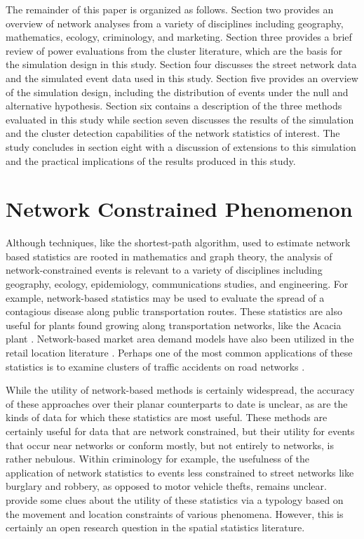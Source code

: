 \documentclass[12pt, letterpaper]{article}
\begin{document}
The remainder of this paper is organized as follows. Section two provides an overview of network analyses from a variety of disciplines including geography, mathematics, ecology, criminology, and marketing. Section three provides a brief review of power evaluations from the cluster literature, which are the basis for the simulation design in this study. Section four discusses the street network data and the simulated event data used in this study. Section five provides an overview of the simulation design, including the distribution of events under the null and alternative hypothesis. Section six contains a description of the three methods evaluated in this study while section seven discusses the results of the simulation and the cluster detection capabilities of the network statistics of interest. The study concludes in section eight with a discussion of extensions to this simulation and the practical implications of the results produced in this study.

\section{Network Constrained Phenomenon}

Although techniques, like the shortest-path algorithm, \citep{dijkstra1959note} used to estimate network based statistics are rooted in mathematics and graph theory, the analysis of network-constrained events is relevant to a variety of disciplines including geography, ecology, epidemiology, communications studies, and engineering. For example, network-based statistics may be used to evaluate the spread of a contagious disease along public transportation routes. These statistics are also useful for plants found growing along transportation networks, like the Acacia plant \citep{spooner2004spatial}. Network-based market area demand models have also been utilized in the retail location literature \citep{okabe2001computational}. Perhaps one of the most common applications of these statistics is to examine clusters of traffic accidents on road networks \citep{yamada2004comparison} \citep{okabe2009kernel}.

While the utility of network-based methods is certainly widespread, the accuracy of these approaches over their planar counterparts to date is unclear, as are the kinds of data for which these statistics are most useful. These methods are certainly useful for data that are network constrained, but their utility for events that occur near networks or conform mostly, but not entirely to networks, is rather nebulous. Within criminology for example, the usefulness of the application of network statistics to events less constrained to street networks like burglary and robbery, as opposed to motor vehicle thefts, remains unclear. \citet{yamada2007local} provide some clues about the utility of these statistics via a typology based on the movement and location constraints of various phenomena. However, this is certainly an open research question in the spatial statistics literature.
\end{document}

